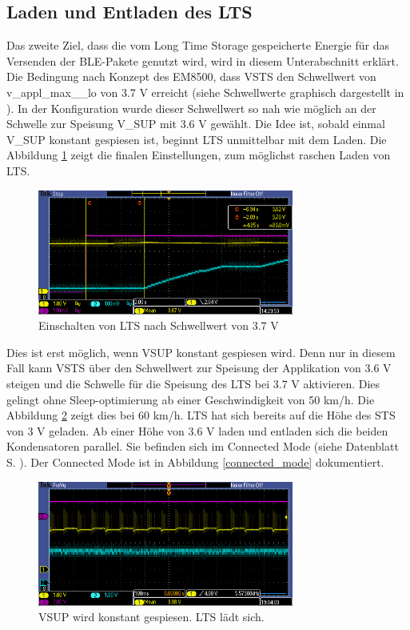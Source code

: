 \subsection{Laden und Entladen des LTS}
\label{res_entladen}

Das zweite Ziel, dass die vom Long Time Storage gespeicherte Energie für das Versenden der BLE-Pakete genutzt wird, wird in diesem Unterabschnitt erklärt. Die Bedingung nach Konzept des EM8500, dass VSTS den Schwellwert von v\_appl\_max\_\_lo von 3.7 V erreicht (siehe Schwellwerte graphisch dargestellt in ). In der Konfiguration wurde dieser Schwellwert so nah wie möglich an der Schwelle zur Speisung V\_SUP mit 3.6 V gewählt. Die Idee ist, sobald einmal V\_SUP konstant gespiesen ist, beginnt LTS unmittelbar mit dem Laden. Die Abbildung \ref{lts_ein} zeigt die finalen Einstellungen, zum  möglichst raschen Laden von LTS.

\begin{figure}[ht]
   \includegraphics[width=0.75\textwidth]{4Resultate/imag/LTS_Ladeschwelle.PNG}
    \caption{Einschalten von LTS nach Schwellwert von 3.7 V}
    \label{lts_ein}
\end{figure}

Dies ist erst möglich, wenn VSUP konstant gespiesen wird. Denn nur in diesem Fall kann VSTS über den Schwellwert zur Speisung der Applikation von 3.6 V steigen und die Schwelle für die Speisung des LTS bei 3.7 V aktivieren. Dies gelingt ohne Sleep-optimierung ab einer Geschwindigkeit von 50 km/h. Die Abbildung \ref{vsup_konstant} zeigt dies bei 60 km/h. LTS hat sich bereits auf die Höhe des STS von 3 V geladen. Ab einer Höhe von 3.6 V laden und entladen sich die beiden Kondensatoren parallel. Sie befinden sich im Connected Mode (siehe Datenblatt S. ). Der Connected Mode ist in Abbildung \ref{connected_mode} dokumentiert.

\begin{figure}[ht]
   \includegraphics[width=0.75\textwidth]{4Resultate/imag/pic_5.PNG}
    \caption{VSUP wird konstant gespiesen. LTS lädt sich.}
    \label{vsup_konstant}
\end{figure}

